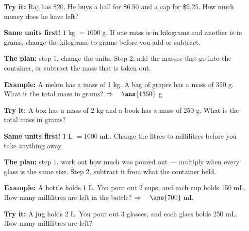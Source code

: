 \documentclass[12pt]{article}
\begin{document}
\begin{tryitbox}
\textbf{Try it:} Raj has \$20. He buys a ball for \$6.50 and a cap for \$9.25.
How much money does he have left?\\[2pt]
\end{tryitbox}


\begin{formulabox}
\textbf{Same units first!} $1$ kg $= 1000$ g. If one mass is in kilograms and
another is in grams, change the kilograms to grams before you add or subtract.\par
\textbf{The plan:} step 1, change the units. Step 2, add the masses that go into
the container, or subtract the mass that is taken out.
\end{formulabox}

\begin{examplebox}
\textbf{Example:} A melon has a mass of 1 kg. A bag of grapes has a mass of 350 g.
What is the total mass in grams?
$\Rightarrow\quad \ans{1350}$ g
\end{examplebox}

\begin{tryitbox}
\textbf{Try it:} A box has a mass of 2 kg and a book has a mass of 250 g. What is
the total mass in grams?\\[2pt]
\end{tryitbox}


\begin{formulabox}
\textbf{Same units first!} $1$ L $= 1000$ mL. Change the litres to millilitres
before you take anything away.\par
\textbf{The plan:} step 1, work out how much was poured out --- multiply when
every glass is the same size. Step 2, subtract it from what the container held.
\end{formulabox}

\begin{examplebox}
\textbf{Example:} A bottle holds 1 L. You pour out 2 cups, and each cup holds
150 mL. How many millilitres are left in the bottle?
$\Rightarrow\quad \ans{700}$ mL
\end{examplebox}

\begin{tryitbox}
\textbf{Try it:} A jug holds 2 L. You pour out 3 glasses, and each glass holds
250 mL. How many millilitres are left?\\[2pt]
\end{tryitbox}
\end{document}
